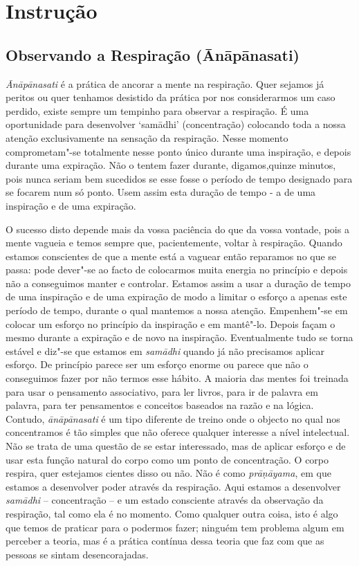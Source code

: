\part{Instrução}

\chapter{Observando a Respiração (Ānāpānasati)}

\emph{Ānāpānasati} é a prática de ancorar a mente na respiração. Quer
sejamos já peritos ou quer tenhamos desistido da prática por nos
considerarmos um caso perdido, existe sempre um tempinho para observar a
respiração. É uma oportunidade para desenvolver `samādhi'
(concentração) colocando toda a nossa atenção exclusivamente na sensação
da respiração. Nesse momento comprometam"-se totalmente nesse ponto único
durante uma inspiração, e depois durante uma expiração. Não o tentem fazer
durante, digamos,quinze minutos, pois nunca seriam bem sucedidos se esse 
fosse o período de tempo designado para se focarem num só ponto. Usem assim  
esta duração de tempo - a de uma inspiração e de uma expiração.

O sucesso disto depende mais da vossa paciência do que da vossa vontade,
pois a mente vagueia e temos sempre que, pacientemente, voltar à
respiração. Quando estamos conscientes de que a mente está a vaguear
então reparamos no que se passa: pode dever"-se ao facto de colocarmos
muita energia no princípio e depois não a conseguimos manter e
controlar. Estamos assim a usar a duração de tempo de uma inspiração e de
uma expiração de modo a limitar o esforço a apenas este período de tempo,
durante o qual mantemos a nossa atenção. Empenhem"-se em colocar um
esforço no princípio da inspiração e em mantê"-lo. Depois façam o
mesmo durante a expiração e de novo na inspiração. Eventualmente tudo se
torna estável e diz"-se que estamos em \emph{samādhi} quando já não
precisamos aplicar esforço. De princípio parece ser um esforço enorme ou
parece que não o conseguimos fazer por não termos esse hábito. A maioria
das mentes foi treinada para usar o pensamento associativo, para ler
livros, para ir de palavra em palavra, para ter pensamentos e conceitos
baseados na razão e na lógica. Contudo, \emph{ānāpānasati} é um tipo
diferente de treino onde o objecto no qual nos concentramos é tão
simples que não oferece qualquer interesse a nível intelectual. Não se
trata de uma questão de se estar interessado, mas de aplicar esforço e
de usar esta função natural do corpo como um ponto de concentração. O
corpo respira, quer estejamos cientes disso ou não. Não é como
\emph{prāṇāyama}, em que estamos a desenvolver poder através da
respiração. Aqui estamos a desenvolver \emph{samādhi} -- concentração -- e 
um estado consciente através da observação da respiração, tal como ela é no
momento. Como qualquer outra coisa, isto é algo que temos de praticar
para o podermos fazer; ninguém tem problema algum em perceber a teoria,
mas é a prática contínua dessa teoria que faz com que as pessoas se
sintam desencorajadas.


